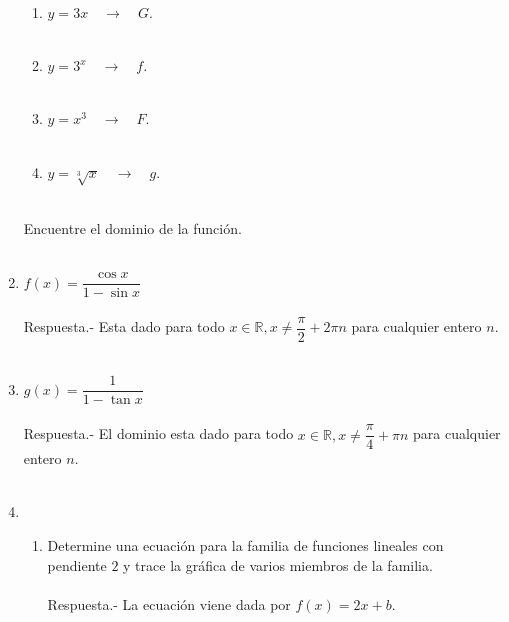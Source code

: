 \begin{enumerate}
\begin{enumerate}[\bfseries (a)]
	    \item $y=3x \quad \rightarrow \quad G$.\\\\

	    \item $y=3^x \quad \rightarrow \quad f$.\\\\

	    \item $y=x^3 \quad \rightarrow \quad F$.\\\\

	    \item $y=\sqrt[3]{x} \quad \rightarrow \quad g$.\\\\
	\end{enumerate}

    Encuentre el dominio de la función.\\\\

    \item $f(x)=\dfrac{\cos x}{1 - \sin x}$\\\\
	Respuesta.-\; Esta dado para todo $x\in \mathbb{R}, x\neq \dfrac{\pi}{2} + 2\pi n$ para cualquier entero $n$.\\\\

    \item $g(x) = \dfrac{1}{1-\tan x}$\\\\
	Respuesta.-\; El dominio esta dado para todo $x \in \mathbb{R}, x \neq \dfrac{\pi}{4} + \pi n$ para cualquier entero $n$.\\\\ 

    \item 
    \begin{enumerate}[\bfseries a)]
	
	\item Determine una ecuación para la familia de funciones lineales con pendiente $2$ y trace la gráfica de varios miembros de la familia.\\\\ 
	Respuesta.-\; La ecuación viene dada por $f(x) = 2x + b$.\\\\


\end{enumerate}
\end{enumerate}
